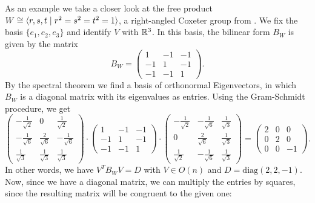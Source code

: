 As an example we take a closer look at the free product \(W \cong\langle r,s,t\;\vert\;r^2=s^2=t^2=1\rangle\), a right-angled Coxeter group from .
We fix the basis \(\{e_1,e_2,e_3\}\) and identify \(V\) with \(\mathbb{R}^3\).
In this basis, the bilinear form \(B_W\) is given by the matrix
\begin{equation*}
    B_W =
    \begin{pmatrix}
        1  & -1 & -1 \\
        -1 & 1  & -1 \\
        -1 & -1 & 1
    \end{pmatrix}.
\end{equation*}
By the spectral theorem we find a basis of orthonormal Eigenvectors, in which \(B_W\) is a diagonal matrix with its eigenvalues as entries.
Using the Gram-Schmidt procedure, we get
\begin{equation*}
    \begin{pmatrix}
        -\frac{1}{\sqrt{2}} & 0                  & \frac{1}{\sqrt{2}}  \\
        -\frac{1}{\sqrt{6}} & \frac{2}{\sqrt{6}} & -\frac{1}{\sqrt{6}} \\
        \frac{1}{\sqrt{3}}  & \frac{1}{\sqrt{3}} & \frac{1}{\sqrt{3}}
    \end{pmatrix} \cdot
    \begin{pmatrix}
        1  & -1 & -1 \\
        -1 & 1  & -1 \\
        -1 & -1 & 1
    \end{pmatrix} \cdot
    \begin{pmatrix}
        -\frac{1}{\sqrt{2}} & -\frac{1}{\sqrt{6}} & \frac{1}{\sqrt{3}} \\
        0                   & \frac{2}{\sqrt{6}}  & \frac{1}{\sqrt{3}} \\
        \frac{1}{\sqrt{2}}  & -\frac{1}{\sqrt{6}} & \frac{1}{\sqrt{3}}
    \end{pmatrix} =
    \begin{pmatrix}
        2 & 0 & 0  \\
        0 & 2 & 0  \\
        0 & 0 & -1
    \end{pmatrix}.
\end{equation*}
In other words, we have \(V^T B_W V = D\) with \(V\in O(n)\) and \(D = \text{diag}(2,2,-1)\).
Now, since we have a diagonal matrix, we can multiply the entries by squares, since the resulting matrix will be congruent to the given one:

